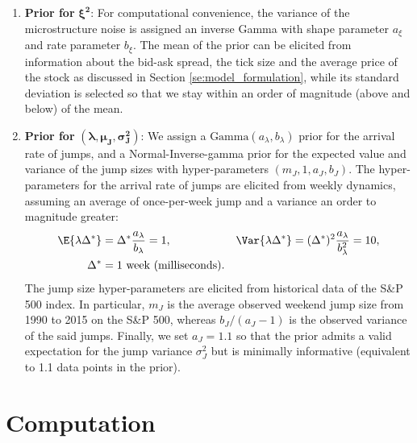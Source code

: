 \begin{enumerate}

\item{\textbf{Prior for} $\boldsymbol{\xi^2}$:}  For computational convenience, the variance of the microstructure noise is assigned an inverse Gamma with shape parameter $a_{\xi}$ and rate parameter $b_{\xi}$.  The mean of the prior can be elicited from information about the bid-ask spread, the tick size and the average price of the stock as discussed in Section \ref{se:model_formulation}, while its standard deviation is selected so that we stay within an order of magnitude (above and below) of the mean.


\item{\textbf{Prior for} $(\boldsymbol{\lambda}, \boldsymbol{\mu_J}, \boldsymbol{\sigma^2_J})$:} We assign a $\mbox{Gamma}(a_\lambda,b_\lambda)$ prior for the arrival rate of jumps, and a Normal-Inverse-gamma prior for the expected value and variance of the jump sizes with hyper-parameters $(m_J, 1, a_J, b_J)$. The hyper-parameters for the arrival rate of jumps are elicited from weekly dynamics, assuming an average of once-per-week jump and a variance an order to magnitude greater:
  \begin{align*}
    \E{\lambda \Delta^*} &= \Delta^* \frac{a_\lambda}{b_\lambda} = 1, & \Var{\lambda \Delta^*} &= (\Delta^*)^2 \frac{a_\lambda}{b_\lambda^2} = 10, \\
    \Delta^* &= 1 \mbox{ week (milliseconds).}
  \end{align*}
  The jump size hyper-parameters are elicited from historical data of the S\&P 500 index. In particular, $m_J$ is the average observed weekend jump size from 1990 to 2015 on the S\&P 500, whereas $b_J/(a_J-1)$ is the observed  variance of the said jumps. Finally, we set $a_J = 1.1$ so that the prior admits a valid expectation for the jump variance $\sigma_J^2$ but is minimally informative (equivalent to 1.1 data points in the prior).

\end{enumerate}


\section{Computation}\label{se:computation}


